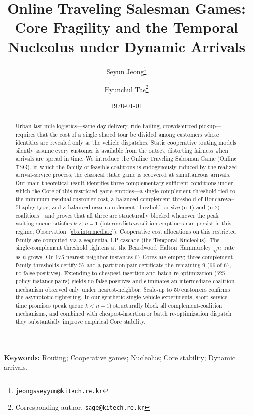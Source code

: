 \documentclass[11pt]{article}
\title{\textbf{Online Traveling Salesman Games: \\ Core Fragility and the Temporal Nucleolus under Dynamic Arrivals}}
\author[1]{Seyun Jeong\thanks{\texttt{jeongsseyyun@kitech.re.kr}}}
\author[1]{Hyunchul Tae\thanks{Corresponding author. \texttt{sage@kitech.re.kr}}}
\affil[1]{Korea Institute of Industrial Technology (KITECH), Cheonan, Republic of Korea}
\date{\today}
\theoremstyle{plain}
\theoremstyle{definition}
\theoremstyle{remark}
\begin{document}
\maketitle

\begin{abstract}
\noindent Urban last-mile logistics---same-day delivery, ride-hailing, crowdsourced pickup---requires that the cost of a single shared tour be divided among customers whose identities are revealed only as the vehicle dispatches. Static cooperative routing models silently assume every customer is available from the outset, distorting fairness when arrivals are spread in time. We introduce the Online Traveling Salesman Game (Online TSG), in which the family of feasible coalitions is endogenously induced by the realized arrival-service process; the classical static game is recovered at simultaneous arrivals. Our main theoretical result identifies three complementary sufficient conditions under which the Core of this restricted game empties---a single-complement threshold tied to the minimum residual customer cost, a balanced-complement threshold of Bondareva--Shapley type, and a balanced-near-complement threshold on size-(n-1) and (n-2) coalitions---and proves that all three are structurally blocked whenever the peak waiting queue satisfies $k<n-1$ (intermediate-coalition emptiness can persist in this regime; Observation~\ref{obs:intermediate}). Cooperative cost allocations on this restricted family are computed via a sequential LP cascade (the Temporal Nucleolus). The single-complement threshold tightens at the Beardwood--Halton--Hammersley $\sqrt{n}$ rate as $n$ grows. On 175 nearest-neighbor instances 67 Cores are empty; three complement-family thresholds certify 57 and a partition-pair certificate the remaining 9 (66 of 67, no false positives). Extending to cheapest-insertion and batch re-optimization (525 policy-instance pairs) yields no false positives and eliminates an intermediate-coalition mechanism observed only under nearest-neighbor. Scale-up to 50 customers confirms the asymptotic tightening. In our synthetic single-vehicle experiments, short service-time promises (peak queue $k<n-1$) structurally block all complement-coalition mechanisms, and combined with cheapest-insertion or batch re-optimization dispatch they substantially improve empirical Core stability.
\end{abstract}

\noindent\textbf{Keywords:} Routing; Cooperative games; Nucleolus; Core stability; Dynamic arrivals.
\end{document}
